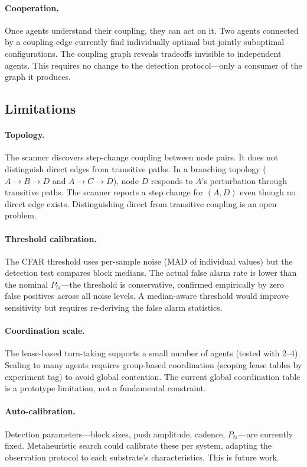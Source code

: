 \paragraph{Cooperation.}
Once agents understand their coupling, they can act on it. Two agents
connected by a coupling edge currently find individually optimal but
jointly suboptimal configurations. The coupling graph reveals
tradeoffs invisible to independent agents. This requires no change to
the detection protocol---only a consumer of the graph it produces.

\subsection{Limitations}

\paragraph{Topology.}
The scanner discovers step-change coupling between node pairs. It does
not distinguish direct edges from transitive paths. In a branching
topology ($A \to B \to D$ and $A \to C \to D$), node $D$ responds to
$A$'s perturbation through transitive paths. The scanner reports a
step change for $(A, D)$ even though no direct edge exists.
Distinguishing direct from transitive coupling is an open problem.

\paragraph{Threshold calibration.}
The CFAR threshold uses per-sample noise (MAD of individual values)
but the detection test compares block medians. The actual false alarm
rate is lower than the nominal $P_{\text{fa}}$---the threshold is
conservative, confirmed empirically by zero false positives across all
noise levels. A median-aware threshold would improve sensitivity but
requires re-deriving the false alarm statistics.

\paragraph{Coordination scale.}
The lease-based turn-taking supports a small number of agents (tested
with 2--4). Scaling to many agents requires group-based coordination
(scoping lease tables by experiment tag) to avoid global contention.
The current global coordination table is a prototype limitation, not
a fundamental constraint.

\paragraph{Auto-calibration.}
Detection parameters---block sizes, push amplitude, cadence,
$P_{\text{fa}}$---are currently fixed. Metaheuristic search could
calibrate these per system, adapting the observation protocol to
each substrate's characteristics. This is future work.
